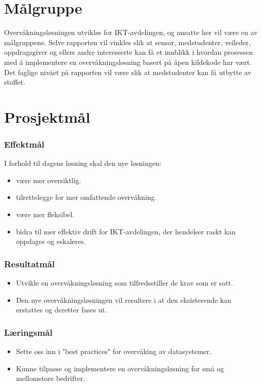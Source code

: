 \section{Målgruppe}
Overvåkningsløsningen utvikles for IKT-avdelingen, og ansatte her vil være en av målgruppene. Selve rapporten vil vinkles slik at sensor, medstudenter, veileder, oppdragsgiver og ellers andre interesserte kan få et innblikk i hvordan prosessen med å implementere en overvåkningsløsning basert på åpen kildekode har vært. Det faglige nivået på rapporten vil være slik at medstudenter kan få utbytte av stoffet.

\section{Prosjektmål}
\subsubsection{Effektmål}
I forhold til dagens løsning skal den nye løsningen:
\begin{itemize}
	\item være mer oversiktlig.
	\item tilrettelegge for mer omfattende overvåkning.
	\item være mer fleksibel.
	\item bidra til mer effektiv drift for IKT-avdelingen, der hendelser raskt kan oppdages og eskaleres.
\end{itemize}

\subsubsection{Resultatmål}
\begin{itemize}
	\item Utvikle en overvåkningsløsning som tilfredsstiller de krav som er satt.
	\item Den nye overvåkningsløsningen vil resultere i at den eksisterende kan erstattes og deretter fases ut.
\end{itemize}

\subsubsection{Læringsmål}
\begin{itemize}
	\item Sette oss inn i "best practices" for overvåking av datasystemer.
	\item Kunne tilpasse og implementere en overvåkningsløsning for små og mellomstore bedrifter.
\end{itemize}

